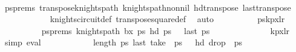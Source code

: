 \begin{isabellebody}
\ \ \ \ \ \ \ \ \ \ \isamarkupfalse%
\ psprems\ transpose{\isacharunderscore}{\kern0pt}knights{\isacharunderscore}{\kern0pt}path\ knights{\isacharunderscore}{\kern0pt}path{\isacharunderscore}{\kern0pt}non{\isacharunderscore}{\kern0pt}nil\ hd{\isacharunderscore}{\kern0pt}transpose\ last{\isacharunderscore}{\kern0pt}transpose\ \isanewline
\ \ \ \ \ \ \ \ \ \ \isamarkupfalse%
\ knights{\isacharunderscore}{\kern0pt}circuit{\isacharunderscore}{\kern0pt}def\ transpose{\isacharunderscore}{\kern0pt}square{\isacharunderscore}{\kern0pt}def\ \isamarkupfalse%
\ auto\isanewline
\isanewline
\ \ \ \ \ \ \ \ \isamarkupfalse%
\ {\isacharquery}{\kern0pt}pskp{}x{}lr{\isachardoublequoteclose}\isanewline
\ \ \ \ \ \ \ \ \isamarkupfalse%
\ psprems{\isacharcolon}{\kern0pt}\ {\isachardoublequoteopen}knights{\isacharunderscore}{\kern0pt}path\ b{}x{}\ {\isacharquery}{\kern0pt}ps\ {\isachardoublequoteopen}hd\ {\isacharquery}{\kern0pt}ps\ {\isacharequal}{\kern0pt}\ {\isacharparenleft}{\kern0pt}{}{\isacharcomma}{\kern0pt}{}{\isacharparenright}{\kern0pt}{\isachardoublequoteclose}\ {\isachardoublequoteopen}last\ {\isacharquery}{\kern0pt}ps\ {\isacharequal}{\kern0pt}\ {\isacharparenleft}{\kern0pt}{}{\isacharcomma}{\kern0pt}{}{\isacharparenright}{\kern0pt}{\isachardoublequoteclose}\isanewline
\ \ \ \ \ \ \ \ \ \ \isamarkupfalse%
\ kp{\isacharunderscore}{\kern0pt}{}x{}{\isacharunderscore}{\kern0pt}lr\ \isamarkupfalse%
\ simp\ eval{\isacharplus}{\kern0pt}\isanewline
\isanewline
\ \ \ \ \ \ \ \ \isamarkupfalse%
\ {\isachardoublequoteopen}{}{}\ {\isacharless}{\kern0pt}\ length\ {\isacharquery}{\kern0pt}ps\ {\isachardoublequoteopen}last\ {\isacharparenleft}{\kern0pt}take\ {}{}\ {\isacharquery}{\kern0pt}ps\ {\isacharequal}{\kern0pt}\ {\isacharparenleft}{\kern0pt}{}{\isacharcomma}{\kern0pt}{}{\isacharparenright}{\kern0pt}{\isachardoublequoteclose}\ {\isachardoublequoteopen}hd\ {\isacharparenleft}{\kern0pt}drop\ {}{}\ {\isacharquery}{\kern0pt}ps\ {\isacharequal}{\kern0pt}\ {\isacharparenleft}{\kern0pt}{}{\isacharcomma}{\kern0pt}{}{\isacharparenright}{\kern0pt}{\isachardoublequoteclose}\ \isamarkupfalse%

\end{isabellebody}

